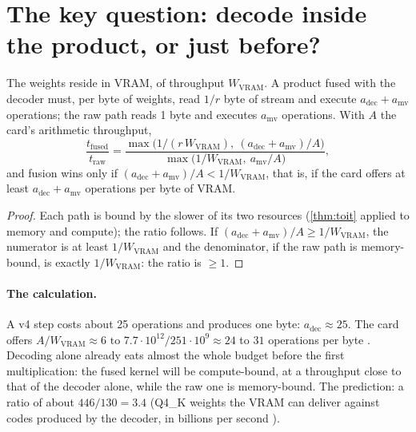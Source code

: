 \section{The key question: decode inside the product, or just before?}\label{sec:ent-question}

\begin{proposition}\label{prop:ent-fondre}
The weights reside in VRAM, of throughput $W_{\mathrm{VRAM}}$. A product fused with the decoder must, per byte of weights, read $1/r$ byte of stream and execute $a_{\mathrm{dec}} + a_{\mathrm{mv}}$ operations; the raw path reads 1 byte and executes $a_{\mathrm{mv}}$ operations. With $A$ the card's arithmetic throughput,
\begin{equation}\label{eq:ent-fondre}
\frac{t_{\mathrm{fused}}}{t_{\mathrm{raw}}} = \frac{\max\bigl(1/(r\,W_{\mathrm{VRAM}}),\ (a_{\mathrm{dec}} + a_{\mathrm{mv}})/A\bigr)}{\max\bigl(1/W_{\mathrm{VRAM}},\ a_{\mathrm{mv}}/A\bigr)},
\end{equation}
and fusion wins only if $(a_{\mathrm{dec}} + a_{\mathrm{mv}})/A < 1/W_{\mathrm{VRAM}}$, that is, if the card offers at least $a_{\mathrm{dec}} + a_{\mathrm{mv}}$ operations per byte of VRAM.
\end{proposition}

\begin{proof}
Each path is bound by the slower of its two resources (\cref{thm:toit} applied to memory and compute); the ratio follows. If $(a_{\mathrm{dec}} + a_{\mathrm{mv}})/A \ge 1/W_{\mathrm{VRAM}}$, the numerator is at least $1/W_{\mathrm{VRAM}}$ and the denominator, if the raw path is memory-bound, is exactly $1/W_{\mathrm{VRAM}}$: the ratio is $\ge 1$.
\end{proof}

\paragraph{The calculation.} A v4 step costs about 25 operations and produces one byte: $a_{\mathrm{dec}} \approx 25$. The card offers $A/W_{\mathrm{VRAM}} \approx 6\text{ to }7.7\cdot10^{12} / 251\cdot10^{9} \approx 24$ to $31$ operations per byte \calc. Decoding alone already eats almost the whole budget before the first multiplication: the fused kernel will be compute-bound, at a throughput close to that of the decoder alone, while the raw one is memory-bound. The prediction: a ratio of about $446/130 = 3.4$ (Q4\_K weights the VRAM can deliver against codes produced by the decoder, in billions per second \calc).

